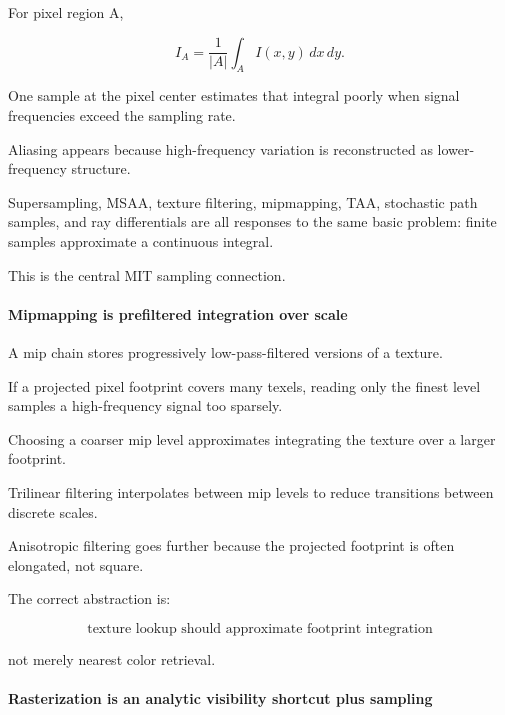 For pixel region A,

\[
I_A
=
\frac{1}{|A|}
\int_A I(x,y)\,dx\,dy.
\]

One sample at the pixel center estimates that integral poorly when signal frequencies exceed the sampling rate.

Aliasing appears because high-frequency variation is reconstructed as lower-frequency structure.

Supersampling, MSAA, texture filtering, mipmapping, TAA, stochastic path samples, and ray differentials are all responses to the same basic problem: finite samples approximate a continuous integral.

This is the central MIT sampling connection.

\paragraph{Mipmapping is prefiltered integration over scale}\label{03-visual-computing-i-ch001-mipmapping-is-prefiltered-integration-over-scale}

\hypertarget{03-visual-computing-i-ch001-mipmapping-is-prefiltered-integration-over-scale}{}

A mip chain stores progressively low-pass-filtered versions of a texture.

If a projected pixel footprint covers many texels, reading only the finest level samples a high-frequency signal too sparsely.

Choosing a coarser mip level approximates integrating the texture over a larger footprint.

Trilinear filtering interpolates between mip levels to reduce transitions between discrete scales.

Anisotropic filtering goes further because the projected footprint is often elongated, not square.

The correct abstraction is:

\[
\boxed{
\text{texture lookup should approximate footprint integration}
}
\]

not merely nearest color retrieval.

\paragraph{Rasterization is an analytic visibility shortcut plus sampling}\label{03-visual-computing-i-ch001-rasterization-is-an-analytic-visibility-shortcut-plus-sampling}

\hypertarget{03-visual-computing-i-ch001-rasterization-is-an-analytic-visibility-shortcut-plus-sampling}{}

